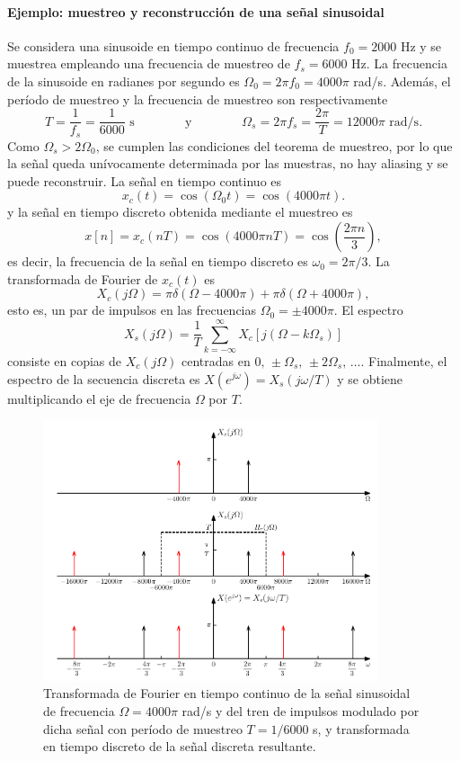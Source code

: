 \documentclass[a4paper]{report}
\begin{document}
\paragraph{Ejemplo: muestreo y reconstrucción de una señal sinusoidal} Se considera una sinusoide en tiempo continuo de frecuencia \(f_0=2000\) Hz y se muestrea empleando una frecuencia de muestreo de \(f_s=6000\) Hz.
La frecuencia de la sinusoide en radianes por segundo es \(\Omega_0=2\pi f_0=4000\pi\) rad/s.
Además, el período de muestreo y la frecuencia de muestreo son respectivamente
\[
 T=\frac{1}{f_s}=\frac{1}{6000}\textrm{ s}
  \qquad\qquad\textrm{y}\qquad\qquad 
 \Omega_s=2\pi f_s=\frac{2\pi}{T}=12000\pi\textrm{ rad/s}.
\]
Como \(\Omega_s>2\Omega_0\), se cumplen las condiciones del teorema de muestreo, por lo que la señal queda unívocamente determinada por las muestras, no hay aliasing y se puede reconstruir. La señal en tiempo continuo es 
\[
 x_c(t)=\cos(\Omega_0t)=\cos(4000\pi t).
\]
y la señal en tiempo discreto obtenida mediante el muestreo es
\[
 x[n]=x_c(nT)=\cos(4000\pi nT)=\cos\left(\frac{2\pi n}{3}\right),
\]
es decir, la frecuencia de la señal en tiempo discreto es \(\omega_0=2\pi/3\). La transformada de Fourier de \(x_c(t)\) es
\[
X_c(j\Omega)=\pi\delta(\Omega-4000\pi)+\pi\delta(\Omega+4000\pi),
\]
esto es, un par de impulsos en las frecuencias \(\Omega_0=\pm4000\pi\). El espectro 
\[
 X_s(j\Omega)=\frac{1}{T}\sum_{k=-\infty}^\infty X_c[j(\Omega-k\Omega_s)]
\]
consiste en copias de \(X_c(j\Omega)\) centradas en \(0,\,\pm\Omega_s,\,\pm2\Omega_s,\,\dots\). Finalmente, el espectro de la secuencia discreta es \(X(e^{j\omega})=X_s(j\omega/T)\) y se obtiene multiplicando el eje de frecuencia \(\Omega\) por \(T\).
\begin{figure}[!htb]
 \begin{center}
 \includegraphics[width=0.88\textwidth]{figuras/sampling_example_04_01_cosine.pdf}
 \caption{\label{fig:sampling_example_04_01_cosine} Transformada de Fourier en tiempo continuo de la señal sinusoidal de frecuencia \(\Omega=4000\pi\) rad/s y del tren de impulsos modulado por dicha señal con período de muestreo \(T=1/6000\) s, y transformada en tiempo discreto de la señal discreta resultante.}
 \end{center}
\end{figure} 
\end{document}
